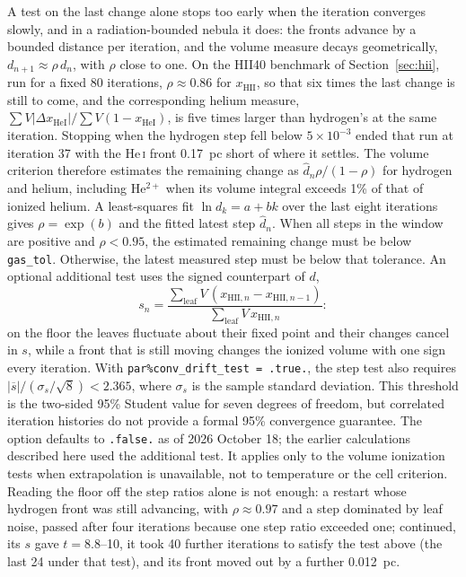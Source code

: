 \documentclass[twocolumn,linenumbers]{aastex702}
\newcommand{\code}[1]{\texttt{#1}}
\newcommand{\HeI}{He\,\textsc{i}}
\begin{document}
A test on the last change alone stops too early when the iteration
converges slowly, and in a radiation-bounded nebula it does: the fronts
advance by a bounded distance per iteration, and the volume measure decays
geometrically, $d_{n+1} \approx \rho\,d_n$, with $\rho$ close to one.  On
the HII40 benchmark of Section~\ref{sec:hii}, run for a fixed 80
iterations, $\rho \approx 0.86$ for $x_{\mathrm{HII}}$, so that six times
the last change is still to come, and the corresponding helium measure,
$\sum V|\Delta x_{\mathrm{HeI}}|/\sum V(1-x_{\mathrm{HeI}})$, is five times
larger than hydrogen's at the same iteration.  Stopping when the hydrogen
step fell below $5\times10^{-3}$ ended that run at iteration 37 with the
\HeI{} front 0.17~pc short of where it settles.  The volume criterion
therefore estimates the remaining change as
$\hat d_n\rho/(1-\rho)$ for hydrogen and helium, including He$^{2+}$
when its volume integral exceeds 1\% of that of ionized helium.
A least-squares fit $\ln d_k=a+bk$ over the last eight iterations gives
$\rho=\exp(b)$ and the fitted latest step $\hat d_n$.
When all steps in the window are positive and $\rho<0.95$, the estimated
remaining change must be below \code{gas\_tol}. Otherwise, the latest
measured step must be below that tolerance. An optional additional test
uses the signed counterpart of $d$,
\begin{equation}
  s_n = \frac{\sum_{\mathrm{leaf}} V\,(x_{\mathrm{HII},n} - x_{\mathrm{HII},n-1})}
             {\sum_{\mathrm{leaf}} V\,x_{\mathrm{HII},n}} :
\end{equation}
on the floor the leaves fluctuate about their fixed point and their changes
cancel in $s$, while a front that is still moving changes the ionized
volume with one sign every iteration. With
\code{par\%conv\_drift\_test = .true.}, the step test also requires
$|\overline{s}|/(\sigma_s/\sqrt{8})<2.365$, where $\sigma_s$ is the sample
standard deviation. This threshold is the two-sided 95\% Student value
for seven degrees of freedom, but correlated iteration histories do not
provide a formal 95\% convergence guarantee. The option defaults to
\code{.false.} as of 2026 October 18; the earlier calculations described
here used the additional test. It applies only to the volume ionization
tests when extrapolation is unavailable, not to temperature or the cell
criterion. Reading the floor off
the step ratios alone is not enough: a restart whose hydrogen front was
still advancing, with $\rho \approx 0.97$ and a step dominated by leaf
noise, passed after four iterations because one step ratio exceeded one;
continued, its $s$ gave $t = 8.8$--10, it took 40 further iterations to
satisfy the test above (the last 24 under that test), and its front moved
out by a further 0.012~pc.
\end{document}
